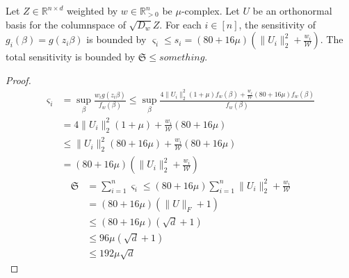 \begin{lemma}
    Let $Z \in \mathbb{R}^{n \times d}$ weighted by $w \in \mathbb{R}^n_{>0}$
    be $\mu$-complex. Let $U$ be an orthonormal basis for the columnspace
    of $\sqrt{D_w} Z$. 
    For each $i \in [n]$, the sensitivity of $g_i(\beta) = g(z_i \beta)$
    is bounded by 
    $\varsigma_i \leq s_i = (80 + 16\mu)(\lVert U_i \rVert_2^2 + \frac{w_i}{\mathcal{W}})$.
    The total sensitivity is bounded by $\mathfrak{S} \leq something$.
\end{lemma}
\begin{proof}
    \begin{align*}
        \varsigma_i 
         & = \sup_{\beta} \frac{w_i g(z_i \beta)}{f_w(\beta)}
        \leq \sup_{\beta} \frac{4 \lVert U_i \rVert_2^2 (1 + \mu) f_w(\beta)
            + \frac{w_i}{\mathcal{W}} (80 + 16 \mu) f_w(\beta)}{f_w(\beta)}                  \\
         & = 4 \lVert U_i \rVert_2^2 (1 + \mu) + \frac{w_i}{\mathcal{W}} (80 + 16 \mu)       \\
         & \leq \lVert U_i \rVert_2^2 (80 + 16 \mu) +  \frac{w_i}{\mathcal{W}} (80 + 16 \mu) \\
         & = (80 + 16\mu)(\lVert U_i \rVert_2^2 + \frac{w_i}{\mathcal{W}})
    \end{align*}
    \begin{align*}
        \mathfrak{S}
         & = \sum_{i=1}^n \varsigma_i \leq (80 + 16\mu) \sum_{i=1}^n \lVert U_i \rVert_2^2 + \frac{w_i}{\mathcal{W}} \\
         & = (80 + 16 \mu)(\lVert U \rVert_F + 1)                                                                    \\
         & \leq (80 + 16 \mu)(\sqrt{d} + 1)                                                                          \\
         & \leq 96 \mu (\sqrt{d} + 1)                                                                                \\
         & \leq 192 \mu \sqrt{d}
    \end{align*}
\end{proof}